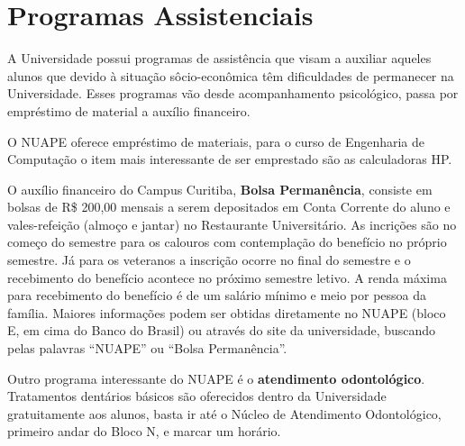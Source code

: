 \documentclass[a4paper,12pt,openany]{article}
\begin{document}
\section{Programas Assistenciais} \label{Sec:assist}

A Universidade possui programas de assistência que visam a auxiliar aqueles alunos que devido à situação sôcio-econômica têm dificuldades de permanecer na Universidade.
Esses programas vão desde acompanhamento psicológico, passa por empréstimo de material a auxílio financeiro.

O NUAPE oferece empréstimo de materiais, para o curso de Engenharia de Computação o item mais interessante de ser emprestado são as calculadoras HP.

O auxílio financeiro do Campus Curitiba, \textbf{Bolsa Permanência}, consiste em bolsas de R\$ 200,00 mensais a serem depositados em Conta Corrente do aluno e vales-refeição (almoço e jantar) no Restaurante Universitário. As incrições são no começo do semestre para os calouros com contemplação do benefício no próprio semestre. Já para os veteranos a inscrição ocorre no final do semestre e o recebimento do benefício acontece no próximo semestre letivo. A renda máxima para recebimento do benefício é de um salário mínimo e meio por pessoa da família. Maiores informações podem ser obtidas diretamente no NUAPE (bloco E, em cima do Banco do Brasil) ou através do site da universidade, buscando pelas palavras “NUAPE” ou “Bolsa Permanência”.

Outro programa interessante do NUAPE é o \textbf{atendimento odontológico}. Tratamentos dentários básicos são oferecidos dentro da Universidade gratuitamente aos alunos, basta ir até o Núcleo de Atendimento Odontológico, primeiro andar do Bloco N, e marcar um horário.



\end{document}
